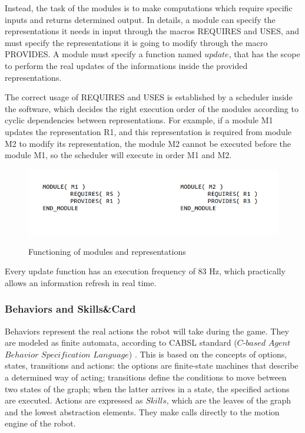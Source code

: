 \documentclass[a4paper, onecolumn, 12pt]{article}
\begin{document}
Instead, the task of the modules is to make computations which require specific inputs and returns
determined output. In details, a module can specify the representations it needs in input through
the macros REQUIRES and USES, and must specify the representations it is going to modify through
the macro PROVIDES. A module must specify a function named $update$, that has the scope to 
perform the real updates of the informations inside the provided representations.

The correct usage of REQUIRES and USES is established by a scheduler inside the software, which decides 
the right execution order of the modules according to cyclic dependencies between representations.
For example, if a module M1 updates the representation R1, and this representation is required from 
module M2 to modify its representation, the module M2 cannot be executed before the module M1, so the
scheduler will execute in order M1 and M2. 
\begin{figure}[h]
    \centering
    \includegraphics[width=0.8\linewidth]{assets/modules.png}
    \label{fig:modules}
    \caption{Functioning of modules and representations}
\end{figure}

Every update function has an execution frequency of 83 Hz, which practically allows an information 
refresh in real time.

\subsubsection{Behaviors and Skills\&Card}
Behaviors represent the real actions the robot will take during the game. They are modeled as finite 
automata, according to CABSL standard ($C$-$based$ $Agent$ $Behavior$ $Specification$ $Language$) \cite{CABSL}.
This is based on the concepts of options, states, transitions and actions: the options are finite-state machines that
describe a determined way of acting; transitions define the conditions to move between two states of the graph; 
when the latter arrives in a state, the specified actions are executed.
Actions are expressed as $Skills$, which are the leaves of the graph and the lowest abstraction elements.
They make calls directly to the motion engine of the robot.
\end{document}
